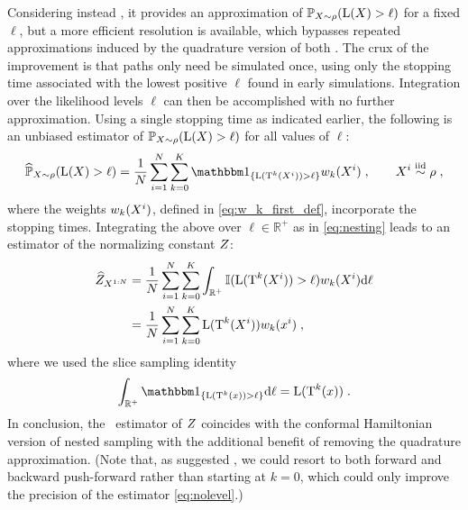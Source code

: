 \documentclass{article}
\begin{document}
Considering instead \IFIS, it provides an approximation of $\mathbb{P}_{X\sim\rho}(\mathrm{L}(X)> \ell)$ for
a fixed $\ell$, but a more efficient resolution is available, which bypasses repeated approximations induced by the quadrature version of both \cite{skilling2006nested,rotskoff:vanden-eijden:2019}. The crux of the improvement is that paths only need be simulated once, using only the stopping time associated with the lowest positive $\ell$ found in early simulations. Integration over the likelihood levels $\ell$ can then be accomplished with no further approximation. Using a single stopping time as indicated earlier, the following is an unbiased estimator of $\mathbb{P}_{X\sim\rho}(\mathrm{L}(X)> \ell)$ for all values of $\ell$: 
\begin{equation}
\widehat{\PP}_{X\sim\rho}(\likelihood(X)> \ell) =\frac{1}{N} \sum_{i=1}^N 
 \sum_{k=0}^K \indiacc{\likelihood(\transfo^{k}(X^i))> \ell} \w_k(X^i)\eqsp,
 \qquad
X^{i}\stackrel{\text{iid}}{\sim}\rho\eqsp,
\end{equation}
where the weights $w_k(X^i)$, defined in \eqref{eq:w_k_first_def}, incorporate the stopping times. Integrating the above over $\ell\in\mathbb{R}^+$ as in \eqref{eq:nesting} leads to an estimator of the normalizing constant $Z$:
\begin{align}\label{eq:nolevel}
\widehat{Z}_{X^{1:N}} &=\frac{1}{N}\sum_{i=1}^{N} \sum_{k=0}^{K}  \int_{\mathbb{R}^+} 
 \mathbb{I}(\mathrm{L}(\operatorname{T}^{k}(X^i))> \ell) w_k(X^i) \mathrm{d} \ell\nonumber\\
 &= \frac{1}{N}\sum_{i=1}^{N} 
 \sum_{k=0}^K\mathrm{L}(\operatorname{T}^k(X^i)) w_k(x^i)\;,
\end{align}
where we used the slice sampling identity 
\[ 
 \int_{\mathbb{R}^+} \indiacc{\likelihood(\transfo^{k}(x))> \ell} \rmd \ell=\likelihood(\transfo^{k}(x))\eqsp.
\]
In conclusion, the \IFIS~estimator of $Z$ coincides with the conformal Hamiltonian version of nested sampling with the additional benefit of removing the quadrature approximation.
(Note that, as suggested , we could resort to both forward and backward push-forward rather than starting at $k=0$, which could only improve the precision of the estimator \eqref{eq:nolevel}.)
\end{document}
